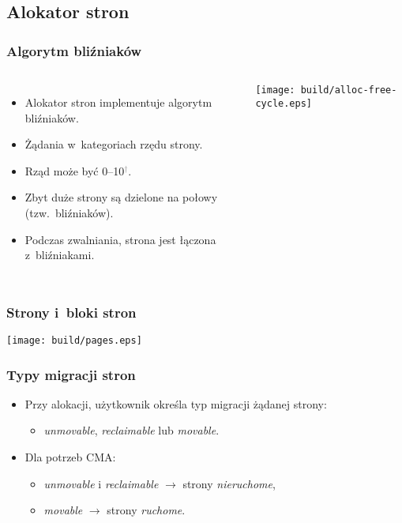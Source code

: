 
\subsection{Alokator stron}

\begin{frame}
  \frametitle{Algorytm bliźniaków}
  \begin{columns}[c]

    \begin{itemize}
    \item Alokator stron implementuje algorytm bliźniaków.
    \item Żądania w~kategoriach rzędu strony.
    \item Rząd może być 0--10\textcolor{gray}{$^\dagger$}.
    \item Zbyt duże strony są dzielone na połowy (tzw.\ bliźniaków).
    \item Podczas zwalniania, strona jest łączona z~bliźniakami.
    \end{itemize}

    \begin{center}
    \texttt{[image: build/alloc-free-cycle.eps]}
    \end{center}
  \end{columns}
\end{frame}

\begin{frame}
  \frametitle{Strony i~bloki stron}
  \begin{center}
  \texttt{[image: build/pages.eps]}
  \end{center}
\end{frame}

\begin{frame}[fragile]
  \frametitle{Typy migracji stron}

  \begin{itemize}
  \item Przy alokacji, użytkownik określa typ migracji żądanej strony:
    \begin{itemize}
    \item \textit{unmovable}, \textit{reclaimable} lub \textit{movable}.
    \end{itemize}
  \item Dla potrzeb CMA:
    \begin{itemize}
    \item \textit{unmovable} i \textit{reclaimable} $\rightarrow$ strony
      \textsl{nieruchome},
    \item \textit{movable} $\rightarrow$ strony \textsl{ruchome}.
    \end{itemize}
  \end{itemize}
\end{frame}

